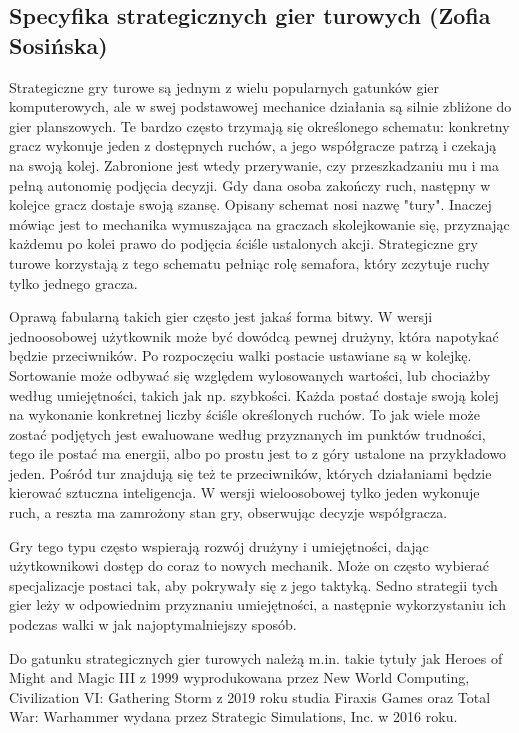 \subsection{Specyfika strategicznych gier turowych (Zofia Sosińska)}\label{ss:tbs}
Strategiczne gry turowe są jednym z wielu popularnych gatunków gier komputerowych, ale w swej podstawowej mechanice działania są silnie zbliżone do
gier planszowych. Te bardzo często trzymają się określonego schematu: konkretny gracz wykonuje jeden z dostępnych ruchów, a jego współgracze patrzą i czekają 
na swoją kolej. Zabronione jest wtedy przerywanie, czy przeszkadzaniu mu i ma pełną autonomię podjęcia decyzji. Gdy dana osoba zakończy ruch, następny w kolejce gracz 
dostaje swoją szansę. Opisany schemat nosi nazwę "tury". Inaczej mówiąc jest to mechanika wymuszająca na graczach skolejkowanie się, przyznając każdemu po kolei  
prawo do podjęcia ściśle ustalonych akcji. Strategiczne gry turowe korzystają z tego schematu pełniąc rolę semafora, który zczytuje ruchy tylko jednego gracza.

Oprawą fabularną takich gier często jest jakaś forma bitwy. W wersji jednoosobowej użytkownik może być dowódcą pewnej drużyny, która napotykać będzie przeciwników. Po 
rozpoczęciu walki postacie ustawiane są w kolejkę. Sortowanie może odbywać się względem wylosowanych wartości, lub chociażby według umiejętności, takich jak np. szybkości. Każda postać
 dostaje swoją kolej na wykonanie konkretnej liczby ściśle określonych ruchów. To jak wiele może zostać podjętych jest ewaluowane według przyznanych im punktów 
 trudności, tego ile postać ma energii, albo po prostu jest to z góry ustalone na przykładowo jeden. Pośród tur znajdują się też te przeciwników, których działaniami będzie 
 kierować sztuczna inteligencja. W wersji wieloosobowej tylko jeden wykonuje ruch, a reszta ma zamrożony stan gry, obserwując decyzje współgracza.

Gry tego typu często wspierają rozwój drużyny i umiejętności, dając użytkownikowi dostęp do coraz to nowych mechanik. Może on często wybierać specjalizacje postaci tak, aby 
pokrywały się z jego taktyką. Sedno strategii tych gier leży w odpowiednim przyznaniu umiejętności, a następnie wykorzystaniu ich podczas walki w jak najoptymalniejszy sposób.

Do gatunku strategicznych gier turowych należą m.in. takie tytuły jak Heroes of Might and Magic III z 1999 wyprodukowana przez New World Computing, 
Civilization VI: Gathering Storm z 2019 roku studia Firaxis Games oraz Total War: Warhammer wydana przez Strategic Simulations, Inc. w 2016 roku.
